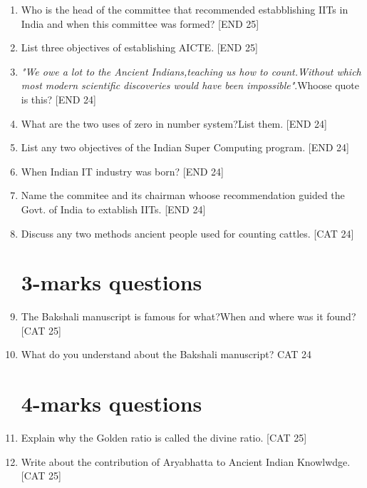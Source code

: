 \documentclass[12pt]{article}
\begin{document}
\begin{enumerate}
			\item Who is the head of the committee that recommended estabblishing IITs in India and when this committee was formed? \hfill{[END 25]}
			
			\item List three objectives of establishing AICTE. \hfill{[END 25]}
			
			\item \textit{"We owe a lot to the Ancient Indians,teaching us how to count.Without which most modern scientific discoveries would have been impossible"}.Whoose quote is this? \hfill{[END 24]}
			
			\item What are the two uses of zero in number system?List them. \hfill{[END 24]}
			
			\item List any two objectives of the Indian Super Computing program. \hfill{[END 24]}
			
			\item When Indian IT industry was born? \hfill{[END 24]}
			
			\item Name the commitee and its chairman whoose recommendation guided the Govt. of India to extablish IITs. \hfill{[END 24]}
			
			\item Discuss any two methods ancient people used for counting cattles. \hfill{[CAT 24]}
			
			
			
			
			
		\section{3-marks questions}
			\item The Bakshali manuscript is famous for what?When and where was it found? \hfill{[CAT 25]}
			
			\item What do you understand about the Bakshali manuscript? \hfill{CAT 24}
		\section{4-marks questions}
			\item Explain why the Golden ratio is called the divine ratio. \hfill{[CAT 25]}
			\item Write about the contribution of Aryabhatta to Ancient Indian Knowlwdge. \hfill{[CAT 25]}
			

\end{enumerate}
\end{document}

